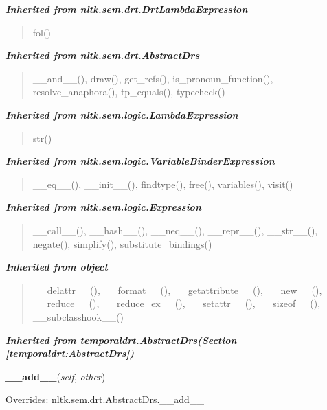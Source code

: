 \large{\textbf{\textit{Inherited from nltk.sem.drt.DrtLambdaExpression}}}

\begin{quote}
fol()
\end{quote}

\large{\textbf{\textit{Inherited from nltk.sem.drt.AbstractDrs}}}

\begin{quote}
\_\_and\_\_(), draw(), get\_refs(), is\_pronoun\_function(), resolve\_anaphora(), tp\_equals(), typecheck()
\end{quote}

\large{\textbf{\textit{Inherited from nltk.sem.logic.LambdaExpression}}}

\begin{quote}
str()
\end{quote}

\large{\textbf{\textit{Inherited from nltk.sem.logic.VariableBinderExpression}}}

\begin{quote}
\_\_eq\_\_(), \_\_init\_\_(), findtype(), free(), variables(), visit()
\end{quote}

\large{\textbf{\textit{Inherited from nltk.sem.logic.Expression}}}

\begin{quote}
\_\_call\_\_(), \_\_hash\_\_(), \_\_neq\_\_(), \_\_repr\_\_(), \_\_str\_\_(), negate(), simplify(), substitute\_bindings()
\end{quote}

\large{\textbf{\textit{Inherited from object}}}

\begin{quote}
\_\_delattr\_\_(), \_\_format\_\_(), \_\_getattribute\_\_(), \_\_new\_\_(), \_\_reduce\_\_(), \_\_reduce\_ex\_\_(), \_\_setattr\_\_(), \_\_sizeof\_\_(), \_\_subclasshook\_\_()
\end{quote}

\large{\textbf{\textit{Inherited from temporaldrt.AbstractDrs\textit{(Section \ref{temporaldrt:AbstractDrs})}}}}

    \vspace{0.5ex}

\hspace{.8\funcindent}\begin{boxedminipage}{\funcwidth}

    \raggedright \textbf{\_\_add\_\_}(\textit{self}, \textit{other})

\setlength{\parskip}{2ex}
\setlength{\parskip}{1ex}
      Overrides: nltk.sem.drt.AbstractDrs.\_\_add\_\_

    \end{boxedminipage}

